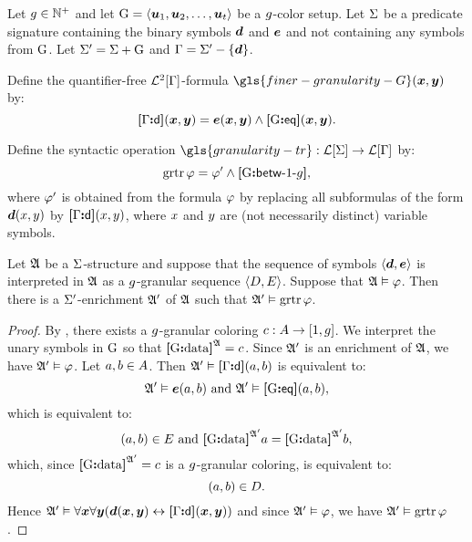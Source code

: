 Let $g \in \mathbb{N}^{+}$ and let ${\mathrm{G}} = \left\langle \bm{u}_{1},\bm{u}_{2},\dots,\bm{u}_{t} \right\rangle$ be a
$g$-color setup.
Let $\mathrm{\Sigma}$ be a predicate signature containing the binary symbols
$\bm{d}$ and $\bm{e}$ and not containing any symbols from ${\mathrm{G}}$.
Let $\mathrm{\Sigma'} = \mathrm{\Sigma} + {\mathrm{G}}$ and $\mathrm{\Gamma} = \mathrm{\Sigma'} - \left\{\bm{d}\right\}$.

\begin{definition}
Define the quantifier-free $\mathcal{L}^{2}[\mathrm{\Gamma}]$-formula
$\gls{finer-granularity-G}(\xx,\yy)$ by:
\[
  {\bm{[}\mathrm{\Gamma}\mathord{\bm{:}}\mathsf{d}\bm{]}}(\bm{x},\bm{y}) = \bm{e}(\bm{x},\bm{y}) \land {\bm{[}{\mathrm{G}}\mathord{\bm{:}}\mathsf{eq}\bm{]}}(\bm{x},\bm{y}).
\]
\end{definition}
\begin{definition}
Define the syntactic operation
$\gls{granularity-tr} : \FoF\SigS \to \FoF\SigG$ by:
\[
  \operatorname{grtr}\varphi = {\varphi'} \land {\bm{[}{\mathrm{G}}\mathord{\bm{:}}\mathsf{betw}{\hbox{-}}1{\hbox{-}}g\bm{]}},
\]
where ${\varphi'}$ is obtained from the formula $\varphi$ by replacing all subformulas
of the form $\bm{d}(x,y)$ by ${\bm{[}\mathrm{\Gamma}\mathord{\bm{:}}\mathsf{d}\bm{]}}(x,y)$, where $x$ and $y$ are (not
necessarily distinct) variable symbols.
\end{definition}

\begin{lemma}\label{lem:granular-f-to-tr}
Let $\mathfrak{A}$ be a $\mathrm{\Sigma}$-structure and suppose that the sequence of
symbols $\left\langle \bm{d},\bm{e} \right\rangle$ is interpreted in $\mathfrak{A}$ as a
$g$-granular sequence $\left\langle D,E \right\rangle$.
Suppose that $\mathfrak{A} \vDash \varphi$.
Then there is a $\mathrm{\Sigma'}$-enrichment $\mathfrak{A'}$ of $\mathfrak{A}$ such that
$\mathfrak{A'} \vDash \operatorname{grtr}\varphi$.
\end{lemma}
\begin{proof}
By , there exists a $g$-granular coloring 
$c : A \to [1,g]$.
We interpret the unary symbols in ${\mathrm{G}}$ so that ${\bm{[}{\mathrm{G}}\mathord{\bm{:}}\mathrm{data}\bm{]}}^{\mathfrak{A}} = c$.
Since $\mathfrak{A'}$ is an enrichment of $\mathfrak{A}$, we have $\mathfrak{A'} \vDash \varphi$.
Let $a, b \in A$.
Then $\mathfrak{A'} \vDash {\bm{[}\mathrm{\Gamma}\mathord{\bm{:}}\mathsf{d}\bm{]}}(a,b)$ is equivalent to:
\[
  \mathfrak{A'} \vDash \bm{e}(a,b) \text{ and } \mathfrak{A'} \vDash {\bm{[}{\mathrm{G}}\mathord{\bm{:}}\mathsf{eq}\bm{]}}(a,b),
\]
which is equivalent to:
\[
  (a,b) \in E \text{ and } {\bm{[}{\mathrm{G}}\mathord{\bm{:}}\mathrm{data}\bm{]}}^{\mathfrak{A'}}a = {\bm{[}{\mathrm{G}}\mathord{\bm{:}}\mathrm{data}\bm{]}}^{\mathfrak{A'}}b,
\]
which, since ${\bm{[}{\mathrm{G}}\mathord{\bm{:}}\mathrm{data}\bm{]}}^{\mathfrak{A'}} = c$ is a $g$-granular coloring, is
equivalent to:
\[
  (a,b) \in D.
\]
Hence $\mathfrak{A'} \vDash \forall\bm{x}\forall\bm{y}(\bm{d}(\bm{x},\bm{y}) \leftrightarrow {\bm{[}\mathrm{\Gamma}\mathord{\bm{:}}\mathsf{d}\bm{]}}(\bm{x},\bm{y}))$
and since $\mathfrak{A'} \vDash \varphi$, we have $\mathfrak{A'} \vDash \operatorname{grtr}\varphi$.
\end{proof}

